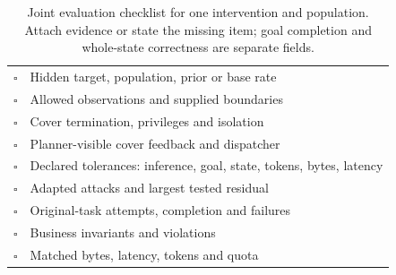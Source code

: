 \begin{table}[t]\centering\footnotesize
\caption{Joint evaluation checklist for one intervention and population. Attach evidence or state the missing item; goal completion and whole-state correctness are separate fields.}\label{tab:joint-checklist}
\begin{tabularx}{\columnwidth}{@{}lY@{}}\toprule
$\square$ & Hidden target, population, prior or base rate \\
$\square$ & Allowed observations and supplied boundaries \\
$\square$ & Cover termination, privileges and isolation \\
$\square$ & Planner-visible cover feedback and dispatcher \\
$\square$ & Declared tolerances: inference, goal, state, tokens, bytes, latency \\
$\square$ & Adapted attacks and largest tested residual \\
$\square$ & Original-task attempts, completion and failures \\
$\square$ & Business invariants and violations \\
$\square$ & Matched bytes, latency, tokens and quota \\\bottomrule
\end{tabularx}\end{table}
